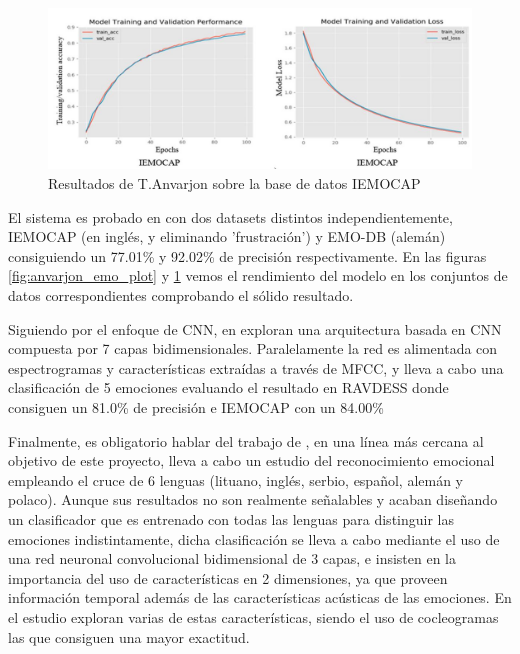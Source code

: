 \documentclass[11pt,a4paper,spanish]{book}
\begin{document}
	\begin{figure}[H]
		\centering
		\includegraphics[scale=0.35]{anvarjon2020_imeocap.JPG} 
		\caption{Resultados de T.Anvarjon sobre la base de datos IEMOCAP}
		\label{fig:anvarjon_ime_plot}
	\end{figure}

	El sistema es probado en con dos datasets distintos independientemente, IEMOCAP (en inglés, y eliminando 'frustración') y EMO-DB (alemán) consiguiendo un 77.01\% y 92.02\%  de precisión respectivamente. En las figuras \ref{fig:anvarjon_emo_plot} y \ref{fig:anvarjon_ime_plot} vemos el rendimiento del modelo en los conjuntos de datos correspondientes comprobando el sólido resultado.
	
	

	
	 Siguiendo por el enfoque de CNN, en \cite{Mustaqeem2020} exploran una arquitectura basada en CNN compuesta por 7 capas bidimensionales. Paralelamente la red es alimentada con espectrogramas y características extraídas a través de MFCC, y lleva a cabo una clasificación de 5 emociones evaluando el resultado en RAVDESS donde consiguen un 81.0\% de precisión e IEMOCAP con un 84.00\%
	 
	 Finalmente, es obligatorio hablar del trabajo de \cite{Tamulevicius2020}, en una línea más cercana al objetivo de este proyecto, lleva a cabo un estudio del reconocimiento emocional empleando el cruce de 6 lenguas (lituano, inglés, serbio, español, alemán y polaco). Aunque sus resultados no son realmente señalables y acaban diseñando un clasificador que es entrenado con todas las lenguas para distinguir las emociones indistintamente, dicha clasificación se lleva a cabo mediante el uso de una red neuronal convolucional bidimensional de 3 capas, e insisten en la importancia del uso de características en 2 dimensiones, ya que proveen información temporal además de las características acústicas de las emociones. En el estudio exploran varias de estas características, siendo el uso de cocleogramas las que consiguen una mayor exactitud.
	
\end{document}
